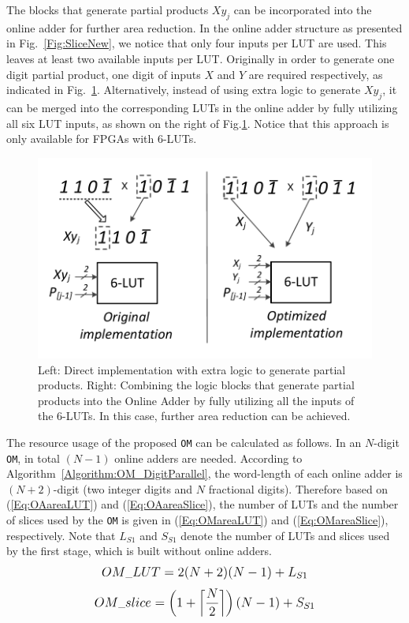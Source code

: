 \documentclass[conference]{IEEEtran}
\begin{document}
The blocks that generate partial products $Xy_j$ can be incorporated into the online adder for further area reduction. In the online adder structure as presented in Fig.~\ref{Fig:SliceNew}, we notice that only four inputs per LUT are used. This leaves at least two available inputs per LUT. Originally in order to generate one digit partial product, one digit of inputs $X$ and $Y$ are required respectively, as indicated in Fig.~\ref{Fig:PartialProduct}. Alternatively, instead of using extra logic to generate $Xy_j$, it can be merged into the corresponding LUTs in the online adder by fully utilizing all six LUT inputs, as shown on the right of Fig.\ref{Fig:PartialProduct}. Notice that this approach is only available for FPGAs with 6-LUTs.
%
\begin{figure}[tbp]
	\centering
	\includegraphics[width=.4\textwidth]{./Figures/PartialProduct.pdf}
	\vspace{-1ex}
	\caption{Left: Direct implementation with extra logic to generate partial products. Right: Combining the logic blocks that generate partial products into the Online Adder by fully utilizing all the inputs of the 6-LUTs. In this case, further area reduction can be achieved.}
	\label{Fig:PartialProduct}
	\vspace{-1ex}
\end{figure}

The resource usage of the proposed \texttt{OM} can be calculated as follows. In an $N$-digit \texttt{OM}, in total $(N-1)$ online adders are needed. According to Algorithm~\ref{Algorithm:OM_DigitParallel}, the word-length of each online adder is $(N+2)$-digit (two integer digits and $N$ fractional digits). Therefore based on (\ref{Eq:OAareaLUT}) and (\ref{Eq:OAareaSlice}), the number of LUTs and the number of slices used by the \texttt{OM} is given in (\ref{Eq:OMareaLUT}) and (\ref{Eq:OMareaSlice}), respectively. Note that $L_{S1}$ and $S_{S1}$ denote the number of LUTs and slices used by the first stage, which is built without online adders.
%
\begin{eqnarray}\label{Eq:OMareaLUT}
\scriptsize
	OM\_{LUT} = 2(N+2)(N-1) + {L}_{S1}
\normalsize
\end{eqnarray}
%
\begin{eqnarray}\label{Eq:OMareaSlice}
\scriptsize
	OM\_{slice} = \left(1+\left\lceil{\frac{N}{2}}\right\rceil\right)(N-1)+S_{S1}
\normalsize
\end{eqnarray}
\end{document}
